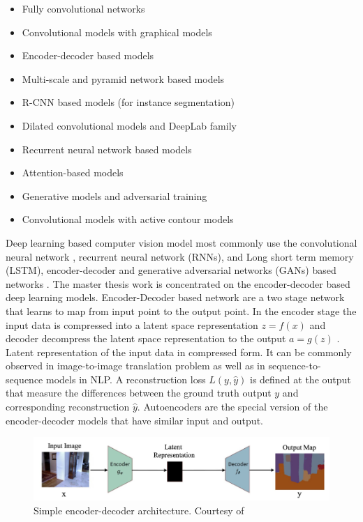     \begin{itemize}
    	\item Fully convolutional networks
    	\item Convolutional models with graphical models
    	\item Encoder-decoder based models
    	\item Multi-scale and pyramid network based models
    	\item R-CNN based models (for instance segmentation)
    	\item Dilated convolutional models and DeepLab family
    	\item Recurrent neural network based models
    	\item Attention-based models
    	\item Generative models and adversarial training
    	\item Convolutional models with active contour models
    \end{itemize}
    
    Deep learning based computer vision model most commonly use the convolutional neural network \cite{61_chen2017rethinking}, recurrent neural network (RNNs), and Long short term memory (LSTM), encoder-decoder \cite{62_badrinarayanan2017segnet} and generative adversarial networks (GANs) based networks \cite{60_minaee2021image}. The master thesis work is concentrated on the encoder-decoder based deep learning models. Encoder-Decoder based network are a two stage network that learns to map from input point to the output point. In the encoder stage the input data is compressed into a latent space representation $ z = f(x)$ and decoder decompress the latent space representation to the output $ a = g(z)$ \cite{63_goodfellow2014generative}. Latent representation of the input data in compressed form. It can be commonly observed in image-to-image translation problem as well as in sequence-to-sequence models in NLP. A reconstruction loss $ L(y, \hat{y})$ is defined at the output that measure the differences between the ground truth output $y$ and corresponding reconstruction $\hat{y}$. Autoencoders are the special version of the encoder-decoder models that have similar input and output.
    
    \begin{figure}[h]
    	\centering
    	\includegraphics[width=14cm]{images/en_de.png}
    	\caption{Simple encoder-decoder architecture. Courtesy of \cite{60_minaee2021image}}
    	\label{fig:en_de}
    \end{figure} 		
    
